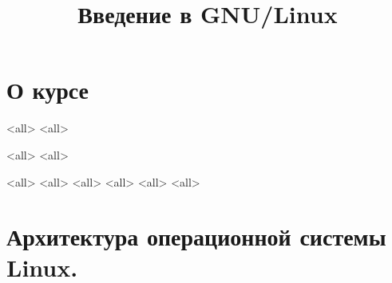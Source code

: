 

\title{Введение в GNU/Linux}




\begin{frame}
	\frametitle{}
	\titlepage
	\vspace{-0.5cm}
	\begin{center}
	\end{center}
\end{frame}


\begin{frame}
	\tableofcontents
	[hideallsubsections]
\end{frame}


\section{О курсе}

\mode<all>{}
\mode<all>{}

\mode<all>{}
\mode<all>{}

\mode<all>{}
\mode<all>{}
\mode<all>{}
\mode<all>{}
\mode<all>{}
\mode<all>{}

\section{Архитектура операционной системы Linux. }

